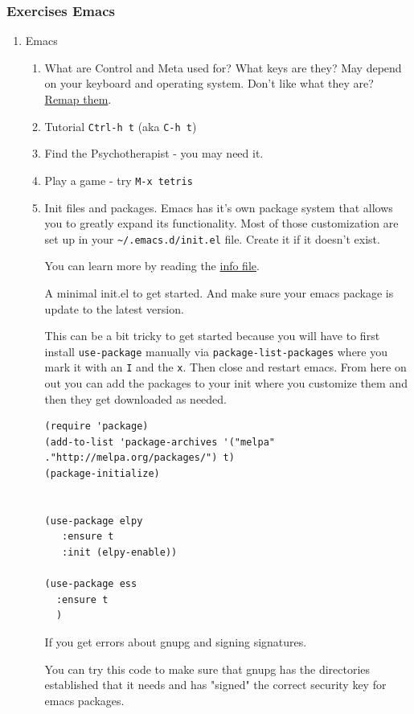 \documentclass{article}
\begin{document}
\subsubsection{Exercises Emacs}
\label{sec:org98eaf7c}
\begin{enumerate}
\item Emacs
\label{sec:org4bff71d}
\begin{enumerate}
\item What are Control and Meta used for? What keys are they?
May depend on your keyboard and operating system. Don't like what they are? \href{https://www.x.org/releases/current/doc/man/man1/xmodmap.1.xhtml}{Remap them}.
\item Tutorial \texttt{Ctrl-h t} (aka \texttt{C-h t})
\item Find the Psychotherapist - you may need it.
\item Play a game - try \texttt{M-x tetris}
\item Init files and packages. 
Emacs has it's own package system that allows you to greatly expand its functionality. Most of those customization are set up in your \texttt{\textasciitilde{}/.emacs.d/init.el} file. Create it if it doesn't exist. 

You can learn more by reading the \href{emacs\#Init File}{info file}.

A minimal init.el to get started. And make sure your emacs package is update to the latest version. 

This can be a bit tricky to get started because you will have to first install \texttt{use-package} manually via \texttt{package-list-packages} where you mark it with an \texttt{I} and the \texttt{x}. Then close and restart emacs.  From here on out you can add the packages to your init where you customize them and then they get downloaded as needed. 

\begin{verbatim}
(require 'package)
(add-to-list 'package-archives '("melpa" ."http://melpa.org/packages/") t)
(package-initialize)


(use-package elpy
   :ensure t
   :init (elpy-enable))

(use-package ess
  :ensure t
  )
\end{verbatim}

If you get errors about gnupg and signing signatures.

You can try this code to make sure that gnupg has the directories established that it needs and has "signed" the correct security key for emacs packages. 


\end{enumerate}
\end{enumerate}
\end{document}
